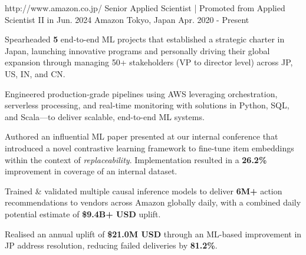 

\begin{cventries}

  \cventry
    {http://www.amazon.co.jp/}
    {Senior Applied Scientist | Promoted from Applied Scientist II in Jun. 2024} %
    {Amazon} %
    {Tokyo, Japan} %
    {Apr. 2020 - Present} %
    {
      \begin{cvitems} %
        \item {Spearheaded \textbf{5} end-to-end ML projects that established a strategic charter in Japan, launching innovative programs and personally driving their global expansion through managing 50+ stakeholders (VP to director level) across JP, US, IN, and CN.}
        \item {Engineered production-grade pipelines using AWS leveraging orchestration, serverless processing, and real-time monitoring with solutions in Python, SQL, and Scala—to deliver scalable, end-to-end ML systems.}
        \item {Authored an influential ML paper presented at our internal conference that introduced a novel contrastive learning framework to fine-tune item embeddings within the context of \textit{replaceability}. Implementation resulted in a \textbf{26.2\%} improvement in coverage of an internal dataset.}
        \item {Trained \& validated multiple causal inference models to deliver \textbf{6M+} action recommendations to vendors across Amazon globally daily, with a combined daily potential estimate of \textbf{\$9.4B+ USD} uplift.}
        \item {Realised an annual uplift of \textbf{\$21.0M USD} through an ML-based improvement in JP address resolution, reducing failed deliveries by \textbf{81.2\%}.}
      \end{cvitems}
    }



\end{cventries}
